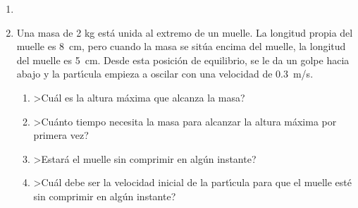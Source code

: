 \documentclass[12pt,twoside]{article}
\begin{document}
\begin{enumerate}
\item 
{}


\item
Una masa de 2 kg  est\'{a} unida al extremo de un muelle.
La longitud propia del muelle es 8~cm, pero cuando la masa
se sit\'{u}a encima del muelle, la longitud del muelle es   5~cm.
Desde esta posici\'{o}n de equilibrio, se le da un golpe hacia
abajo y la part\'{\i}cula empieza a oscilar con una velocidad de 
0.3~m/s. 

\begin{enumerate}
\item >Cu\'{a}l es la altura m\'{a}xima que alcanza la masa?
\item >Cu\'{a}nto tiempo necesita la masa para alcanzar la 
altura m\'{a}xima por primera vez?
\item  >Estar\'{a} el muelle sin comprimir en alg\'{u}n instante? 
\item >Cu\'{a}l debe ser la velocidad inicial de la part\'{\i}cula para
que el  muelle est\'{e} sin comprimir en alg\'{u}n instante?
\end{enumerate}


\end{enumerate}
\end{document}
